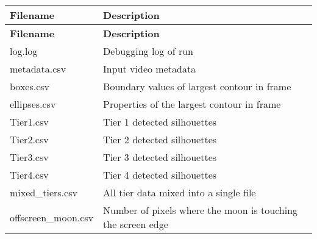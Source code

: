 \tabulinesep=1mm
\begin{longtabu} spread 0pt [c]{*{2}{|X[-1]}|}
\hline
\rowcolor{\tableheadbgcolor}\textbf{ Filename }&\textbf{ Description  }\\
\endfirsthead
\hline
\endfoot
\hline
\rowcolor{\tableheadbgcolor}\textbf{ Filename }&\textbf{ Description  }\\
\endhead
log.\+log &Debugging log of run \\
metadata.\+csv &Input video metadata \\
boxes.\+csv &Boundary values of largest contour in frame \\
ellipses.\+csv &Properties of the largest contour in frame \\
Tier1.\+csv &Tier 1 detected silhouettes \\
Tier2.\+csv &Tier 2 detected silhouettes \\
Tier3.\+csv &Tier 3 detected silhouettes \\
Tier4.\+csv &Tier 4 detected silhouettes \\
mixed\+\_\+tiers.\+csv &All tier data mixed into a single file \\
offscreen\+\_\+moon.\+csv &Number of pixels where the moon is touching the screen edge \\
\end{longtabu}

